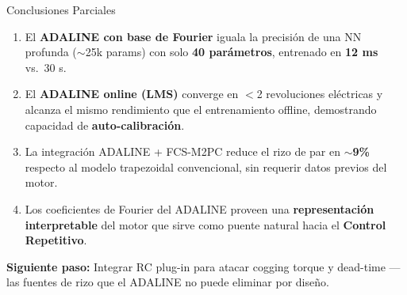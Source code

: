 \begin{frame}{Conclusiones Parciales}
    \begin{enumerate}
        \item El \textbf{ADALINE con base de Fourier} iguala la precisión de una NN profunda ($\sim$25k params) con solo \textbf{40 parámetros}, entrenado en \textbf{12 ms} vs.\ 30 s.
        
        \vspace{0.2cm}
        
        \item El \textbf{ADALINE online (LMS)} converge en $<$2 revoluciones eléctricas y alcanza el mismo rendimiento que el entrenamiento offline, demostrando capacidad de \textbf{auto-calibración}.
        
        \vspace{0.2cm}
        
        \item La integración ADALINE + FCS-M2PC reduce el rizo de par en $\sim$\textbf{9\%} respecto al modelo trapezoidal convencional, sin requerir datos previos del motor.
        
        \vspace{0.2cm}
        
        \item Los coeficientes de Fourier del ADALINE proveen una \textbf{representación interpretable} del motor que sirve como puente natural hacia el \textbf{Control Repetitivo}.
    \end{enumerate}
    
    \vspace{0.3cm}
    
    \begin{center}
        \textbf{Siguiente paso:} Integrar RC plug-in para atacar cogging torque y dead-time --- las fuentes de rizo que el ADALINE no puede eliminar por diseño.
    \end{center}
\end{frame}
